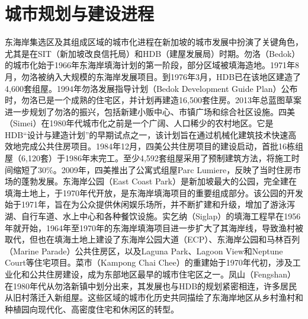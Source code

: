\documentclass[11pt,a4paper,twoside,openany]{book}
\begin{document}
\section{城市规划与建设进程}
东海岸集选区及其组成区域的城市化进程在新加坡的城市发展中扮演了关键角色，尤其是在SIT（新加坡改良信托局）和HDB（建屋发展局）时期。勿洛（Bedok）的城市化始于1966年东海岸填海计划的第一阶段，部分区域被填海造地。1971年8月，勿洛被纳入大规模的东海岸发展项目。到1976年3月，HDB已在该地区建造了4,600套组屋。1994年勿洛发展指导计划（Bedok Development Guide Plan）公布时，勿洛已是一个成熟的住宅区，并计划再建造16,500套住房。2013年总蓝图草案进一步规划了勿洛的振兴，包括新建小贩中心、市镇广场和综合社区设施。四美（Simei）在1980年代城市化之前是一个广阔、人口稀少的农村地区。它是HDB“设计与建造计划”的早期试点之一，该计划旨在通过机械化建筑技术快速高效地完成公共住房项目。1984年12月，四美公共住房项目的建设启动，首批16栋组屋（6,120套）于1986年末完工。至少4,592套组屋采用了预制建筑方法，将施工时间缩短了30\%。2009年，四美推出了公寓式组屋Parc Lumiere，反映了当时住房市场的蓬勃发展。东海岸公园（East Coast Park）是新加坡最大的公园，完全建在填海土地上，于1970年代开放，是东海岸填海项目的重要组成部分。该公园的开发始于1971年，旨在为公众提供休闲娱乐场所，并不断扩建和升级，增加了游泳泻湖、自行车道、水上中心和各种餐饮设施。实乞纳（Siglap）的填海工程早在1956年就开始，1964年至1970年的东海岸填海项目进一步扩大了其海岸线，导致渔村被取代，但也在填海土地上建设了东海岸公园大道（ECP）、东海岸公园和马林百列（Marine Parade）公共住房区，以及Laguna Park、Lagoon View和Neptune Court等住宅项目。菜市（Kampong Chai Chee）的重建始于1970年代初，涉及工业化和公共住房建设，成为东部地区最早的城市住宅区之一。凤山（Fengshan）在1980年代从勿洛新镇中划分出来，其发展也与HDB的规划紧密相连，许多居民从旧村落迁入新组屋。这些区域的城市化历史共同描绘了东海岸地区从乡村渔村和种植园向现代化、高密度住宅和休闲区的转型。
\end{document}

